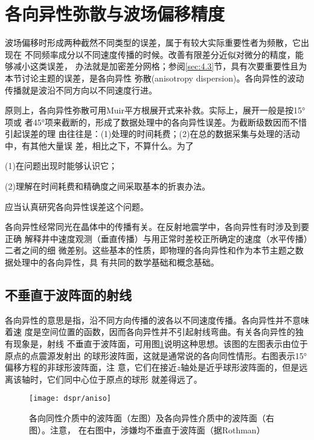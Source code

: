 \section{各向异性弥散与波场偏移精度}
\label{sec:4.2}

波场偏移时形成两种截然不同类型的误差，属于有较大实际重要性者为频散，它出现在
不同频率成分以不同速度传播的时候。改善有限差分近似对微分的精度，能够减小这类误差，
办法就是加密差分网格；参阅\ref{sec:4.3}节，具有次要重要性且为本节讨论主题的误差，是各向异性
弥散(anisotropy dispersion)。各向异性的波动传播就是波沿不同方向以不同速度行进。

原则上，各向异性弥散可用Muir平方根展开式来补救。实际上，展开一般是按15°项或
者45°项来截断的，形成了数据处理中的各向异性误差。为截断级数因而不惜引起误差的理
由往往是：(1)处理的时间耗费；(2)在总的数据采集与处理的活动中，有其他大量误
差，相比之下，不算什么。为了

(1)在问题出现时能够认识它；

(2)理解在时间耗费和精确度之间采取基本的折衷办法。

应当认真研究各向异性误差这个问题。

各向异性经常同光在晶体中的传播有关。在反射地震学中，各向异性有时涉及到要正确
解释井中速度观测（垂直传播）与用正常时差校正所确定的速度（水平传播）二者之间的细
微差别。这些基本的性质，即物理的各向异性和作为本节主题之数据处理中的各向异性，具
有共同的数学基础和概念基础。



\subsection{不垂直于波阵面的射线}
\label{sec:4.2.1}

各向异性的意思是指，沿不同方向传播的波各以不同速度传播。各向异性并不意味着速
度是空间位置的函数，因而各向异性并不引起射线弯曲。有关各向异性的独有现象是，射线
不垂直于波阵面，可用图\ref{fig:dspr/aniso}说明这种思想。该图的左图表示由位于原点的点震源发射出
的球形波阵面，这就是通常说的各向同性情形。右图表示15°偏移方程的非球形波阵面，注
意，它们在接近$z$轴处是近乎球形波阵面的，但是远离该轴时，它们同中心位于原点的球形
就差得远了。

\begin{figure}[H]
\centering
\texttt{[image: dspr/aniso]}
\caption[aniso]{各向同性介质中的波阵面（左图）及各向异性介质中的波阵面（右图）。注意，
在右图中，涉嫌均不垂直于波阵面（据Rothman）}
\label{fig:dspr/aniso}
\end{figure}

